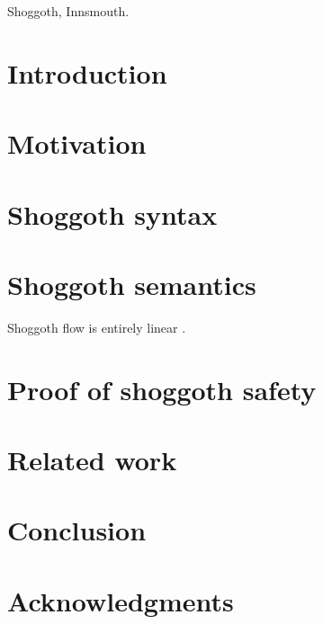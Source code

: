 \maketitle

\begin{abstract}
  
\end{abstract}

\iffinalformat

    \keywords
    Shoggoth, Innsmouth.
\fi

\section{Introduction}
\label{sec:intro}

\section{Motivation}
\label{sec:motivation}

\section{Shoggoth syntax}
\label{sec:syntax}

\section{Shoggoth semantics}
\label{sec:semantics}

Shoggoth flow is entirely linear \cite{zm02-hosc}.

\section{Proof of shoggoth safety}
\label{sec:safety}

\section{Related work}
\label{sec:related}

\section{Conclusion}
\label{sec:conclusions}

\ifacknowledgments
\section*{Acknowledgments}


\fi



